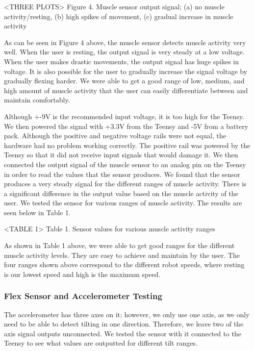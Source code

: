 \documentclass[12pt,scrartcl,titlepage]{article}
\begin{document}
  <THREE PLOTS> Figure 4. Muscle sensor output signal; (a) no muscle activity/resting, (b) high spikes of movement, (c) gradual increase in muscle activity

  As can be seen in Figure 4 above, the muscle sensor detects muscle activity very well. When the user is resting, the output signal is very steady at a low voltage. When the user makes drastic movements, the output signal has huge spikes in voltage. It is also possible for the user to gradually increase the signal voltage by gradually flexing harder. We were able to get a good range of low, medium, and high amount of muscle activity that the user can easily differentiate between and maintain comfortably.

  Although +-9V is the recommended input voltage, it is too high for the Teensy. We then powered the signal with +3.3V from the Teensy and -5V from a battery pack. Although the positive and negative voltage rails were not equal, the hardware had no problem working correctly. The positive rail was powered by the Teensy so that it did not receive input signals that would damage it. We then connected the output signal of the muscle sensor to an analog pin on the Teensy in order to read the values that the sensor produces. We found that the sensor produces a very steady signal for the different ranges of muscle activity. There is a significant difference in the output value based on the muscle activity of the user. We tested the sensor for various ranges of muscle activity. The results are seen below in Table 1.

  <TABLE 1> Table 1. Sensor values for various muscle activity ranges

  As shown in Table 1 above, we were able to get good ranges for the different muscle activity levels. They are easy to achieve and maintain by the user. The four ranges shown above correspond to the different robot speeds, where resting is our lowest speed and high is the maximum speed.
  
  \subsubsection{Flex Sensor and Accelerometer Testing}

  The accelerometer has three axes on it; however, we only use one axis, as we only need to be able to detect tilting in one direction. Therefore, we leave two of the axis signal outputs unconnected. We tested the sensor with it connected to the Teensy to see what values are outputted for different tilt ranges.
\end{document}
